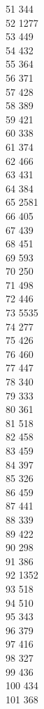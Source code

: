 { 51	344 \\
 52	1277 \\
 53	449 \\
 54	432 \\
 55	364 \\
 56	371 \\
 57	428 \\
 58	389 \\
 59	421 \\
 60	338 \\
 61	374 \\
 62	466 \\
 63	431 \\
 64	384 \\
 65	2581 \\
 66	405 \\
 67	439 \\
 68	451 \\
 69	593 \\
 70	250 \\
 71	498 \\
 72	446 \\
 73	5535 \\
 74	277 \\
 75	426 \\
 76	460 \\
 77	447 \\
 78	340 \\
 79	333 \\
 80	361 \\
 81	518 \\
 82	458 \\
 83	459 \\
 84	397 \\
 85	326 \\
 86	459 \\
 87	441 \\
 88	339 \\
 89	422 \\
 90	298 \\
 91	386 \\
 92	1352 \\
 93	518 \\
 94	510 \\
 95	343 \\
 96	379 \\
 97	416 \\
 98	327 \\
 99	436 \\
 100	434 \\
 101	368 \\
}
